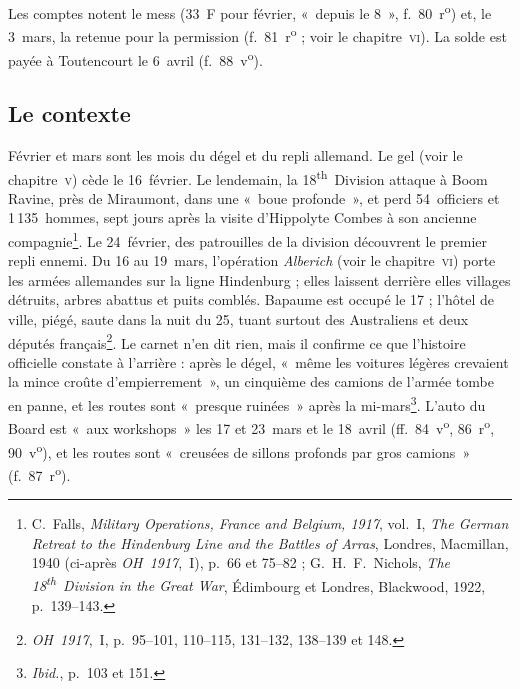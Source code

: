 Les comptes notent le mess (33~F pour février, «~depuis le 8~», f.~80~r\textsuperscript{o}) et, le 3~mars, la retenue pour la permission (f.~81~r\textsuperscript{o} ; voir le chapitre~\textsc{vi}). La solde est payée à Toutencourt le 6~avril (f.~88~v\textsuperscript{o}).

\subsection*{Le contexte}

Février et mars sont les mois du dégel et du repli allemand. Le gel (voir le chapitre~\textsc{v}) cède le 16~février. Le lendemain, la 18\textsuperscript{th}~Division attaque à Boom Ravine, près de Miraumont, dans une «~boue profonde~», et perd 54~officiers et 1\,135~hommes, sept jours après la visite d'Hippolyte Combes à son ancienne compagnie\footnote{C.~Falls, \textit{Military Operations, France and Belgium, 1917}, vol.~I, \textit{The German Retreat to the Hindenburg Line and the Battles of Arras}, Londres, Macmillan, 1940 (ci-après \textit{OH~1917},~I), p.~66 et 75--82 ; G.~H.~F.~Nichols, \textit{The 18\textsuperscript{th}~Division in the Great War}, Édimbourg et Londres, Blackwood, 1922, p.~139--143.}. Le 24~février, des patrouilles de la division découvrent le premier repli ennemi. Du 16 au 19~mars, l'opération \textit{Alberich} (voir le chapitre~\textsc{vi}) porte les armées allemandes sur la ligne Hindenburg ; elles laissent derrière elles villages détruits, arbres abattus et puits comblés. Bapaume est occupé le 17 ; l'hôtel de ville, piégé, saute dans la nuit du 25, tuant surtout des Australiens et deux députés français\footnote{\textit{OH~1917},~I, p.~95--101, 110--115, 131--132, 138--139 et 148.}. Le carnet n'en dit rien, mais il confirme ce que l'histoire officielle constate à l'arrière : après le dégel, «~même les voitures légères crevaient la mince croûte d'empierrement~», un cinquième des camions de l'armée tombe en panne, et les routes sont «~presque ruinées~» après la mi-mars\footnote{\textit{Ibid.}, p.~103 et 151.}. L'auto du Board est «~aux workshops~» les 17 et 23~mars et le 18~avril (ff.~84~v\textsuperscript{o}, 86~r\textsuperscript{o}, 90~v\textsuperscript{o}), et les routes sont «~creusées de sillons profonds par gros camions~» (f.~87~r\textsuperscript{o}).

